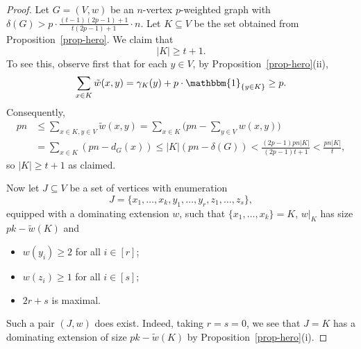 \documentclass[10pt,a4paper]{amsart}
\newcommand{\cG}{\mathcal{G}}
\begin{document}
\begin{proof}
	Let $G=(V,w)$ be an $n$-vertex $p$-weighted graph with $\delta(G)>p\cdot\frac{(t-1)(2p-1)+1}{t(2p-1)+1}\cdot n$.	%
	Let $K \subseteq V$ be the set obtained from Proposition~\ref{prop-hero}. We claim that
	\begin{equation}\label{eq-K}
		|K|\ge t+1.
	\end{equation}
	To see this, observe first that for each $y\in V$, by Proposition~\ref{prop-hero}(ii), 
	$$\sum_{x \in K}\tilde{w}(x,y)=\gamma_K(y)+p\cdot\mathbbm{1}_{\{y\in K\}}\ge p.$$
	Consequently,
	\begin{align}
		pn &\leq \sum_{x \in K,y \in V}\tilde{w}(x,y) =\sum_{x \in K}\Big(pn-\sum_{y\in V}w(x,y)\Big)\nonumber\\
		&=\sum_{x \in K}(pn-d_G(x)) \leq |K|(pn-\delta(G)) < \frac{(2p-1)pn|K|}{(2p-1)t+1} < \frac{pn|K|}{t},\label{eq:ricecake}
	\end{align}
	so $|K| \geq t+1$ as claimed.
	
	Now let $J \subseteq V$ be a set of vertices with enumeration 
	$$J = \lbrace x_1,\ldots,x_k,y_1,\ldots,y_r,z_1,\ldots,z_s\rbrace,$$
	equipped with a dominating extension $w$, such that $\lbrace x_1,\ldots,x_k\rbrace = K$, $w|_K$ has size $pk-\tilde{w}(K)$ and 
	\begin{itemize}
		\item  $w(y_i) \geq 2$ for all $i \in [r]$;
		\item  $w(z_i) \geq 1$ for all $i \in [s]$;
		\item $2r+s$ is maximal.
	\end{itemize}
	Such a pair $(J,w)$ does exist. Indeed, taking $r=s=0$, we see that $J=K$ has a dominating extension of size $pk-\tilde{w}(K)$ by Proposition~\ref{prop-hero}(i).
	

\end{proof}
\end{document}
